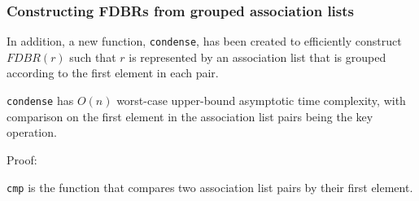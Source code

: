 \documentclass[../main.tex]{subfiles}
\begin{document}

\subsubsection{Constructing FDBRs from grouped association lists}
In addition, a new function, \texttt{condense}, has been created to efficiently construct $FDBR(r)$ such that $r$ is represented by an association list that is grouped according to the first element in each pair.


\begin{theorem}
	\texttt{condense} has $O(n)$ worst-case upper-bound asymptotic time complexity, with comparison on the first element in the association list pairs being the key operation.
\end{theorem}

Proof:

\texttt{cmp} is the function that compares two association list pairs by their first element.  






\end{document}
